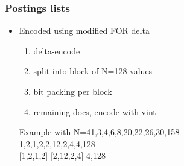 \documentclass{beamer}
\begin{document}
  	\begin{frame}
  		\frametitle{Postings lists}
  		\begin{itemize}
  			\item Encoded using modified FOR delta
  			\begin{enumerate}
  			\item delta-encode
  			\item split into block of N=128 values
  			\item bit packing per block
  			\item remaining docs, encode with vint
  			\end{enumerate}
  			\vskip15pt 
  			Example with N=4\hspace{1cm}1,3,4,6,8,20,22,26,30,158\\
  			\hspace*{4.1cm}1,2,1,2,2,12,2,4,4,128\\
			\hspace*{4.1cm}[1,2,1,2] [2,12,2,4] 4,128\\
  		\end{itemize}
  	\end{frame}
\end{document}
